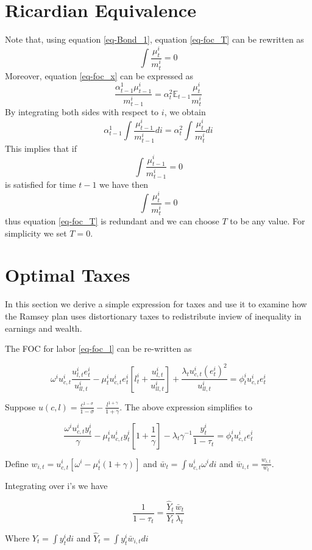 \documentclass[thmsb,11pt]{article}
\newcommand{\EE}{\mathbb E}
\begin{document}
\section{Ricardian Equivalence}
Note that, using equation \eqref{eq-Bond_1}, equation \eqref{eq-foc_T} can be rewritten as 
\[
	\int \frac{\mu^i_t}{m^i_t} = 0
\]  Moreover, equation \eqref{eq-foc_x} can be expressed as
\[
\frac{\alpha^1_{t-1} \mu^i_{t-1}}{m^i_{t-1}} = \alpha^2_t \EE_{t-1} \frac{\mu^i_t}{m^i_t}
\]By integrating both sides with respect to $i$, we obtain
\[
	\alpha^1_{t-1} \int \frac{\mu^i_{t-1}}{m^i_{t-1}}di = \alpha^2_t\int \frac{\mu^i_{t}}{m^i_t} di
\]  This implies that if 
\[
	\int \frac{\mu^i_{t-1}}{m^i_{t-1}} = 0
\]is satisfied for time $t-1$ we have then
\[
	\int \frac{\mu^i_t}{m^i_t} = 0
\] thus equation \eqref{eq-foc_T} is redundant and we can choose $T$ to be any value.  For simplicity we set $T=0$.

\section{Optimal Taxes}
In this section we derive a simple expression for taxes and use it to examine how the Ramsey plan uses distortionary taxes to redistribute inview of inequality in earnings and wealth.  

The FOC for labor \eqref{eq-foc_l} can be re-written as 


 \[
\omega^i u^i_{c,t}\frac{u^i_{l,t} e^i_t}{u^i_{ll,t}}- \mu^i_t u^i_{c,t}e^i_t[l^i_t +\frac{u^i_{l,t}}{u^i_{ll,t}}]+\frac{\lambda_t u^i_{c,t}(e^i_t)^2}{u^i_{ll,t}}=\phi^i_tu^i_{c,t}e^i_t    	
\]

 Suppose $u(c,l)=\frac{c^{1-\sigma}}{1-\sigma}-\frac{l^{1+\gamma}}{1+\gamma}$. The above expression simplifies to


 \[
\frac{ \omega^i u^i_{c,t}y^i_t}{\gamma}- \mu^i_t u^i_{c,t}y^i_t[1 +\frac{1}{\gamma}]-\lambda_t\gamma^{- 1}\frac{y^i_t }{1-\tau_t}=\phi^i_tu^i_{c,t}e^i_t    	
 \]

Define $w_{i,t}=u^i_{c,t}[\omega^i-\mu^i_t(1+\gamma)]$ and $\bar{w}_{t} = \int u^i_{c,t}\omega^i di$ and $\bar{w}_{i,t}=\frac{w_{i,t}}{\bar{w}_t}$.

Integrating  over i's we have

 
\begin{equation}
	\label{eq-labor_taxes}
\frac{1}{1-\tau_t}=\frac{\hat{Y}_t}{Y_t} \frac{\bar{w}_t }{\lambda_t}
\end{equation}   

Where $Y_t=\int y^i_t di$ and $\hat{Y}_t=\int y^i_t \bar{w}_{i,t}di$
\end{document}
